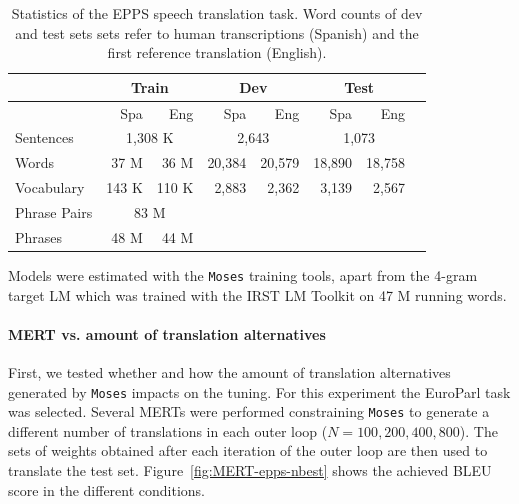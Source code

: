 \documentclass[10pt]{report}
\theoremstyle{plain}
\begin{document}
{\begin{table}[th]
\begin{center}
\begin{tabular}{lrr|rr|rrr}
        &  \multicolumn{2}{c|}{Train}   &  \multicolumn{2}{c|}{Dev}    &  \multicolumn{2}{c}{Test}\\
 \hline
        &  Spa   &   Eng  &  Spa   &   Eng  &  Spa   &   Eng     \\
 \hline
Sentences    &   \multicolumn{2}{c|}{1,308 K} & \multicolumn{2}{c|}{2,643} & \multicolumn{2}{c}{1,073}\\
Words & 37 M & 36 M & 20,384 & 20,579 & 18,890 & 18,758\\
Vocabulary   & 143 K & 110 K & 2,883 &  2,362  & 3,139 & 2,567 \\
Phrase Pairs   & \multicolumn{2}{c|}{83 M}\\
Phrases   & 48 M & 44 M\\
\end{tabular}
\caption{Statistics of the EPPS speech translation task. Word counts of  dev and test sets sets refer
to human transcriptions (Spanish) and the first reference translation (English). }
\begin{center}
\end{center}
\label{tbl:epps-data}
\end{center}
\end{table}

Models were estimated with the {\tt Moses} training tools, apart from the 4-gram target LM which was trained with the IRST LM Toolkit on 47 M running words.


\paragraph{MERT vs. amount of translation alternatives}
First, we tested whether and how the amount of translation alternatives generated by {\tt Moses} impacts on the tuning. For this experiment the EuroParl task was selected. Several MERTs were performed constraining {\tt Moses} to generate a different number of translations in each outer loop ($N=100, 200, 400, 800$). The sets of weights obtained after each iteration of the outer loop are then used to translate the test set. Figure~\ref{fig:MERT-epps-nbest} shows the achieved BLEU score in the different conditions.

}
\end{document}
